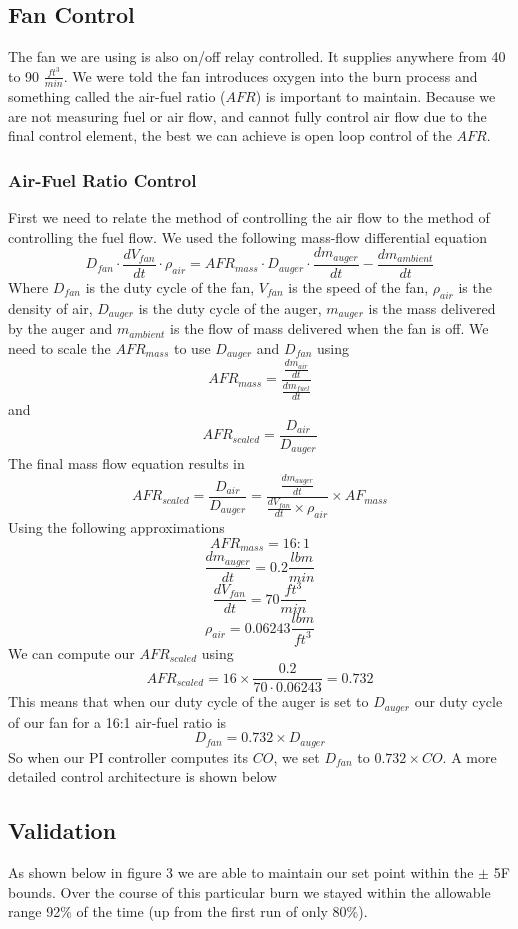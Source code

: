 \documentclass{article}
\begin{document}
\subsection{Fan Control}
The fan we are using is also on/off relay controlled. It supplies anywhere from 40 to 90 $\frac{ft^3}{min}$. We were told the fan introduces oxygen into the burn process and something called the air-fuel ratio ($AFR$) is important to maintain. Because we are not measuring fuel or air flow, and cannot fully control air flow due to the final control element, the best we can achieve is open loop control of the $AFR$. 
\subsubsection{Air-Fuel Ratio Control}
First we need to relate the method of controlling the air flow to the method of controlling the fuel flow. We used the following mass-flow differential equation
\[ D_{fan}\cdot\frac{dV_{fan}}{dt}\cdot \rho_{air}=AFR_{mass} \cdot D_{auger}\cdot \frac{dm_{auger}}{dt}-\frac{dm_{ambient}}{dt}\]
Where $D_{fan}$ is the duty cycle of the fan, $V_{fan}$ is the speed of the fan, $\rho_{air}$ is the density of air, $D_{auger}$ is the duty cycle of the auger, $m_{auger}$ is the mass delivered by the auger and $m_{ambient}$ is the flow of mass delivered when the fan is off. We need to scale the $AFR_{mass}$ to use $D_{auger}$ and $D_{fan}$ using
\[ AFR_{mass} = \frac{\frac{dm_{air}}{dt}}{\frac{dm_{fuel}}{dt}} \]
and
\[ AFR_{scaled} = \frac{D_{air}}{D_{auger}} \]
The final mass flow equation results in
\[ AFR_{scaled} = \frac{D_{air}}{D_{auger}} = \frac{\frac{dm_{auger}}{dt}}{\frac{dV_{fan}}{dt}\times\rho_{air}}\times AF_{mass}\]
Using the following approximations
\[ AFR_{mass} = 16:1\]
\[ \frac{dm_{auger}}{dt} = 0.2 \frac{lbm}{min}\]
\[ \frac{dV_{fan}}{dt} = 70 \frac{ft^3}{min}\]
\[ \rho_{air} = 0.06243 \frac{lbm}{ft^3}\]
We can compute our $AFR_{scaled}$ using
\[ AFR_{scaled} = 16\times\frac{0.2}{70\cdot 0.06243} = 0.732\]
This means that when our duty cycle of the auger is set to $D_{auger}$ our duty cycle of our fan for a 16:1 air-fuel ratio is
\[ D_{fan}=0.732\times D_{auger}\]
So when our PI controller computes its $CO$, we set $D_{fan}$ to $0.732\times CO$. A more detailed control architecture is shown below

\subsection{Validation}
As shown below in figure 3 we are able to maintain our set point within the $\pm$ 5\degree F bounds. Over the course of this particular burn we stayed within the allowable range 92\% of the time (up from the first run of only 80\%).
\end{document}
